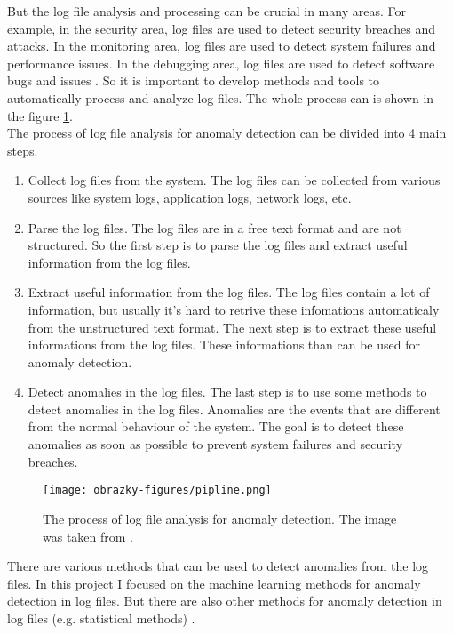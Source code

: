 But the log file analysis and processing can be crucial in many areas. For example, in the security area, log files are used to detect security breaches and attacks. 
In the monitoring area, log files are used to detect system failures and performance issues. In the debugging area, log files are used to detect software bugs and issues \cite{inbook}. %
So it is important to develop methods and tools to automatically process and analyze log files. 
The whole process can is shown in the figure \ref{fig:log_process}.
\\
The process of log file analysis for anomaly detection can be divided into 4 main steps.
\begin{enumerate}
    \item Collect log files from the system. The log files can be collected from various sources like system logs, application logs, network logs, etc. 
    \item Parse the log files. The log files are in a free text format and are not structured. So the first step is to parse the log files and extract useful information from the log files.
    \item Extract useful information from the log files. The log files contain a lot of information, but usually it's hard to retrive these infomations automaticaly from the unstructured text format. The next step is to extract these useful informations from the log files. These informations than can be used for anomaly detection.
    \item Detect anomalies in the log files. The last step is to use some methods to detect anomalies in the log files. Anomalies are the events that are different from the normal behaviour of the system. The goal is to detect these anomalies as soon as possible to prevent system failures and security breaches.
\end{enumerate}


\begin{figure}
    \centering
    \texttt{[image: obrazky-figures/pipline.png]}
    \caption{The process of log file analysis for anomaly detection. The image was taken from \cite{goat}.}
    \label{fig:log_process}
\end{figure}

There are various methods that can be used to detect anomalies from the log files. In this project I focused on the machine learning methods for anomaly detection in log files.
But there are also other methods for anomaly detection in log files (e.g. statistical methods) \cite{article}. %

